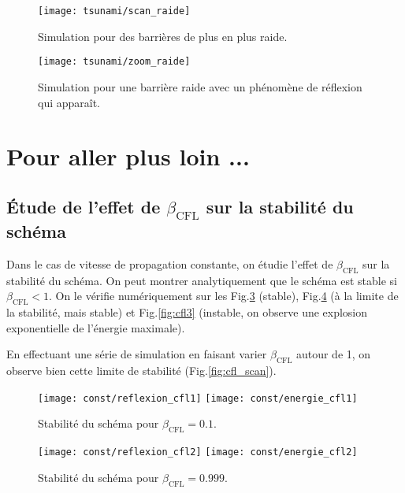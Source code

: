 \documentclass[a4paper,12pt,oneside]{article}
\begin{document}
\begin{figure}[H]
    \centering
    \texttt{[image: tsunami/scan\_raide]}
    \caption{Simulation pour des barrières de plus en plus raide.}
    \label{fig:scan_raide}
\end{figure}

\begin{figure}[H]
    \centering
    \texttt{[image: tsunami/zoom\_raide]}
    \caption{Simulation pour une barrière raide avec un phénomène de réflexion qui apparaît.}
    \label{fig:zoom_raide}
\end{figure}

\section{Pour aller plus loin ...}
\subsection{Étude de l'effet de $\beta_\text{CFL}$ sur la stabilité du schéma}
Dans le cas de vitesse de propagation constante, on étudie l'effet de $\beta_\text{CFL}$ sur la stabilité du schéma. On peut montrer analytiquement que le schéma est stable si $\beta_\text{CFL} < 1$. On le vérifie numériquement sur les Fig.\ref{fig:cfl1} (stable), Fig.\ref{fig:cfl2} (à la limite de la stabilité, mais stable) et Fig.\ref{fig:cfl3} (instable, on observe une explosion exponentielle de l'énergie maximale). 

En effectuant une série de simulation en faisant varier $\beta_\text{CFL}$ autour de 1, on observe bien cette limite de stabilité (Fig.\ref{fig:cfl_scan}). 

\begin{figure}[H]
    \centering
    \texttt{[image: const/reflexion\_cfl1]}
    \texttt{[image: const/energie\_cfl1]}
    \caption{Stabilité du schéma pour $\beta_\text{CFL}=0.1$.}
    \label{fig:cfl1}
\end{figure}

\begin{figure}[H]
    \centering
    \texttt{[image: const/reflexion\_cfl2]}
    \texttt{[image: const/energie\_cfl2]}
    \caption{Stabilité du schéma pour $\beta_\text{CFL}=0.999$.}
    \label{fig:cfl2}
\end{figure}
\end{document}
